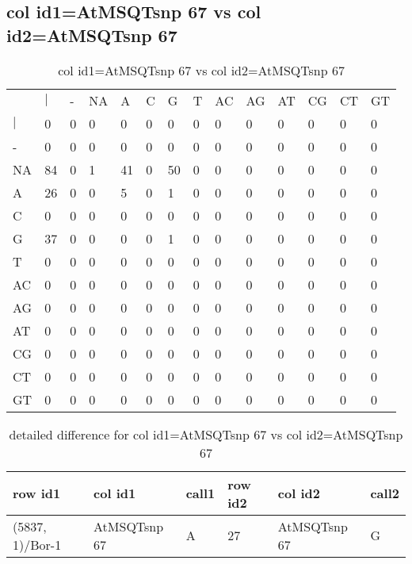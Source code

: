 \subsection{col id1=AtMSQTsnp 67 vs col id2=AtMSQTsnp 67}
\begin{center}
\begin{longtable}{|l|l|l|l|l|l|l|l|l|l|l|l|l|l|}
\caption{col id1=AtMSQTsnp 67 vs col id2=AtMSQTsnp 67} \label{table_dm766}\\
\hline
\\
\hline
&$|$&-&NA&A&C&G&T&AC&AG&AT&CG&CT&GT\\
$|$&0&0&0&0&0&0&0&0&0&0&0&0&0\\
-&0&0&0&0&0&0&0&0&0&0&0&0&0\\
NA&84&0&1&41&0&50&0&0&0&0&0&0&0\\
A&26&0&0&5&0&1&0&0&0&0&0&0&0\\
C&0&0&0&0&0&0&0&0&0&0&0&0&0\\
G&37&0&0&0&0&1&0&0&0&0&0&0&0\\
T&0&0&0&0&0&0&0&0&0&0&0&0&0\\
AC&0&0&0&0&0&0&0&0&0&0&0&0&0\\
AG&0&0&0&0&0&0&0&0&0&0&0&0&0\\
AT&0&0&0&0&0&0&0&0&0&0&0&0&0\\
CG&0&0&0&0&0&0&0&0&0&0&0&0&0\\
CT&0&0&0&0&0&0&0&0&0&0&0&0&0\\
GT&0&0&0&0&0&0&0&0&0&0&0&0&0\\
\hline
\end{longtable}
\end{center}

\begin{center}
\begin{longtable}{|l|l|l|l|l|l|}
\caption{detailed difference for col id1=AtMSQTsnp 67 vs col id2=AtMSQTsnp 67} \label{table_dm767}\\
\hline
row id1&col id1&call1&row id2&col id2&call2\\
\hline
(5837, 1)/Bor-1&AtMSQTsnp 67&A&27&AtMSQTsnp 67&G\\
\hline
\end{longtable}
\end{center}

